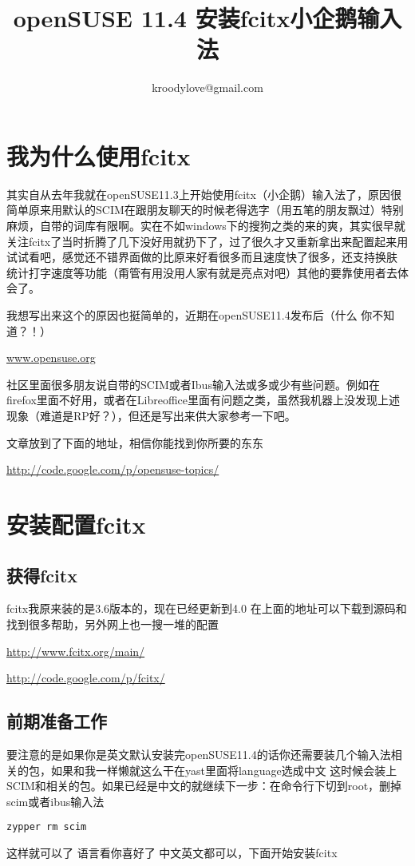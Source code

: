 \documentclass[adobefonts]{ctexart}
\title{\textbf{openSUSE 11.4 安装fcitx小企鹅输入法}}
\author{kroodylove@gmail.com}
\begin{document}
\maketitle
\tableofcontents

\newpage
\section{我为什么使用fcitx}
其实自从去年我就在openSUSE11.3上开始使用fcitx（小企鹅）输入法了，原因很简单原来用默认的SCIM在跟朋友聊天的时候老得选字（用五笔的朋友飘过）特别麻烦，自带的词库有限啊。实在不如windows下的搜狗之类的来的爽，其实很早就关注fcitx了当时折腾了几下没好用就扔下了，过了很久才又重新拿出来配置起来用试试看吧，感觉还不错界面做的比原来好看很多而且速度快了很多，还支持换肤  统计打字速度等功能（甭管有用没用人家有就是亮点对吧）其他的要靠使用者去体会了。

我想写出来这个的原因也挺简单的，近期在openSUSE11.4发布后（什么 你不知道？！）

\href{http://www.opensuse.org}{www.opensuse.org}

社区里面很多朋友说自带的SCIM或者Ibus输入法或多或少有些问题。例如在firefox里面不好用，或者在Libreoffice里面有问题之类，虽然我机器上没发现上述现象（难道是RP好？），但还是写出来供大家参考一下吧。

文章放到了下面的地址，相信你能找到你所要的东东

\href{http://code.google.com/p/opensuse-topics/}{http://code.google.com/p/opensuse-topics/}

\section{安装配置fcitx}
\subsection{获得fcitx}
fcitx我原来装的是3.6版本的，现在已经更新到4.0
在上面的地址可以下载到源码和找到很多帮助，另外网上也一搜一堆的配置

\href{http://www.fcitx.org/main/}{http://www.fcitx.org/main/}

\href{http://code.google.com/p/fcitx/}{http://code.google.com/p/fcitx/}

\subsection{前期准备工作}

要注意的是如果你是英文默认安装完openSUSE11.4的话你还需要装几个输入法相关的包，如果和我一样懒就这么干在yast里面将language选成中文
这时候会装上SCIM和相关的包。如果已经是中文的就继续下一步：在命令行下切到root，删掉scim或者ibus输入法
\begin{verbatim}
zypper rm scim
\end{verbatim}
这样就可以了
语言看你喜好了 中文英文都可以，下面开始安装fcitx
\end{document}

